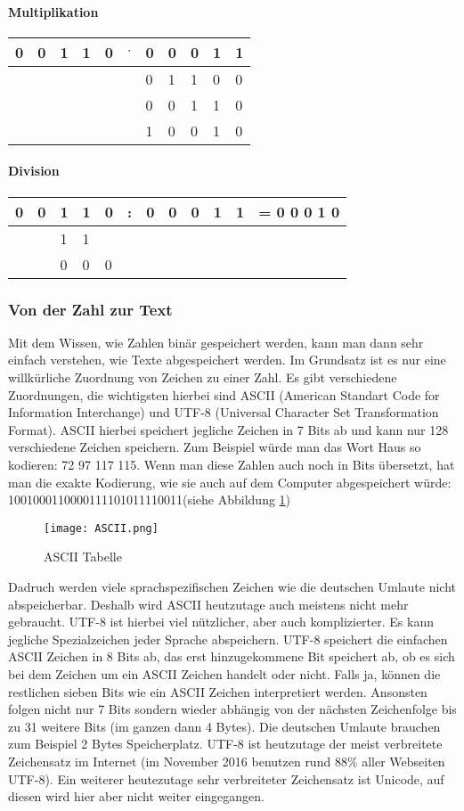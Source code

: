 \paragraph{Multiplikation}
\begin{tabular}{lllllllllll}
0&0&1&1&0& $\cdot$ &0&0&0&1&1 \\ \hline
&&&&&&0&1&1&0&0 \\
&&&&&&0&0&1&1&0 \\ \hline
&&&&&&1&0&0&1&0
\end{tabular}
\paragraph{Division}
\begin{tabular}{lllllllllll l}
0&0&1&1&0& : &0&0&0&1&1 & = 0 0 0 1 0 \\ \hline
 & &1&1& & &&&&&& \\ \cline{3-4}
 & &0&0&0& &&&&&& \\ 
\end{tabular}
\subsubsection{Von der Zahl zur Text}
Mit dem Wissen, wie Zahlen binär gespeichert werden, kann man dann sehr einfach verstehen, wie Texte abgespeichert werden. Im Grundsatz ist es nur eine willkürliche Zuordnung von Zeichen zu einer Zahl. Es gibt verschiedene Zuordnungen, die wichtigsten hierbei sind ASCII (American Standart Code for Information Interchange) und UTF-8 (Universal Character Set Transformation Format). ASCII hierbei speichert jegliche Zeichen in 7 Bits ab und kann nur 128 verschiedene Zeichen speichern. Zum Beispiel würde man das Wort Haus so kodieren: 72 97 117 115. Wenn man diese Zahlen auch noch in Bits übersetzt, hat man die exakte Kodierung, wie sie auch auf dem Computer abgespeichert würde: 1001000110000111101011110011(siehe Abbildung \ref{fig:ASCII})
\begin{figure}[htbp] 
  \centering
     \texttt{[image: ASCII.png]}
  \caption{ASCII Tabelle \cite{ASCII}}
  \label{fig:ASCII}
\end{figure}
Dadruch werden viele sprachspezifischen Zeichen wie die deutschen Umlaute nicht abspeicherbar. Deshalb wird ASCII heutzutage auch meistens nicht mehr gebraucht. UTF-8 ist hierbei viel nützlicher, aber auch komplizierter. Es kann jegliche Spezialzeichen jeder Sprache abspeichern. UTF-8 speichert die einfachen ASCII Zeichen in 8 Bits ab, das erst hinzugekommene Bit speichert ab, ob es sich bei dem Zeichen um ein ASCII Zeichen handelt oder nicht. Falls ja, können die restlichen sieben Bits wie ein ASCII Zeichen interpretiert werden. Ansonsten folgen nicht nur 7 Bits sondern wieder abhängig von der nächsten Zeichenfolge bis zu 31 weitere Bits (im ganzen dann 4 Bytes). Die deutschen Umlaute brauchen zum Beispiel 2 Bytes Speicherplatz. UTF-8 ist heutzutage der meist verbreitete Zeichensatz im Internet (im November 2016 benutzen rund 88\% aller Webseiten UTF-8). \cite{UTF-8} Ein weiterer heutezutage sehr verbreiteter Zeichensatz ist Unicode, auf diesen wird hier aber nicht weiter eingegangen.
